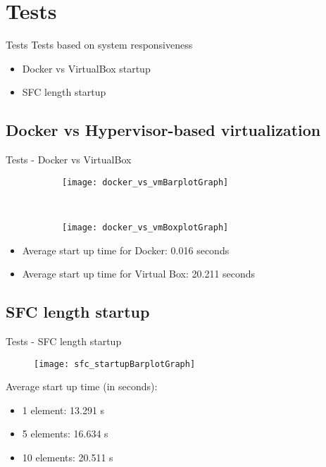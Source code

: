 \section{Tests}
\begin{frame}{Tests}
  Tests based on system responsiveness
  \begin{itemize}
    \item<1-> Docker vs VirtualBox startup
    \item<2-> SFC length startup 
  \end{itemize}
\end{frame}

\subsection{Docker vs Hypervisor-based virtualization}
\begin{frame}{Tests - Docker vs VirtualBox}

  \begin{figure}
    \centering
    \begin{subfigure}[b]{0.45\textwidth}
      \texttt{[image: docker\_vs\_vmBarplotGraph]}
    \end{subfigure}
    ~
    \begin{subfigure}[b]{0.45\textwidth}
      \texttt{[image: docker\_vs\_vmBoxplotGraph]}
    \end{subfigure}
  \end{figure}
  \begin{itemize}
  \item Average start up time for Docker: 0.016 seconds
  \item Average start up time for Virtual Box: 20.211 seconds
  \end{itemize}
\end{frame}

\subsection{SFC length startup}
\begin{frame}{Tests - SFC length startup}
  \begin{figure}
    \centering
    \texttt{[image: sfc\_startupBarplotGraph]}
  \end{figure}

  Average start up time (in seconds):
  \begin{multicols}{2}
    \begin{itemize}
    \item 1 element: 13.291 s
    \item 5 elements: 16.634 s
    \item 10 elements: 20.511 s
    \end{itemize}
  \end{multicols}

  \vfill
\end{frame}
